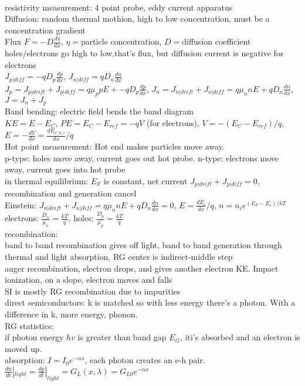 \documentclass{article}
\begin{document}
\\resistivity measurement: 4 point probe, eddy current apparatus
\\Diffusion: random thermal mothion, high to low concentration, must be a concentration gradient
\\Flux $F=-D\frac{d\eta}{dx}$, $\eta=$particle concentration, $D=$diffusion coefficient
\\holes/electrons go high to low,that's flux, but diffusion current is negative for electrons
\\$J_{p|diff}=-qD_p\frac{dp}{dx}$, $J_{n|diff}=qD_n\frac{dn}{dx}$
\\$J_p=J_{p|drift}+J_{p|diff}=q\mu_ppE+-qD_p\frac{dp}{dx}$, $J_n=J_{n|drift}+J_{n|diff}=q\mu_nnE+qD_n\frac{dn}{dx}$, $J=J_n+J_p$
\\Band bending: electric field bends the band diagram
\\$KE=E-E_C$, $PE=E_C-E_{ref}=-qV$ (for electrons), $V=-(E_C-E_{ref})/q$, $E=-\frac{dV}{dx}=\frac{dE_{C,V,i}}{dx}/q$
\\Hot point measurement: Hot end makes particles move away. 
\\p-type: holes move away, current goes out hot probe. n-type: electrons move away, current goes into hot probe
\\in thermal equilibrium: $E_F$ is constant, net current $J_{p|drift}+J_{p|diff}=0$, recombination and generation cancel
\\Einstein: $J_{n|drift}+J_{n|diff}=q\mu_nnE+qD_n\frac{dn}{dx}=0$, $E=\frac{dE_i}{dx}/q$, $n=n_ie^{(E_F-E_i)/kT}$
\\electrons: $\frac{D_n}{\mu_n}=\frac{kT}{q}$, holes: $\frac{D_p}{\mu_p}=\frac{kT}{q}$
\\recombination:
\\band to band recombination gives off light, band to band generation through thermal and light absorption, RG center is indirect-middle step
\\auger recombination, electron drops, and gives another electron KE. Impact ionization, on a slope, electron moves and falls
\\SI is mostly RG recombination due to impurities
\\direct semiconductors: k is matched so with less energy there's a photon. With a difference in k, more energy, phonon.
\\RG statistics:
\\if photon energy $hv$ is greater than band gap $E_G$, iti's absorbed and an electron is moved up.
\\absorption: $I=I_0e^{-\alpha x}$, each photon creates an e-h pair. $\frac{dn}{dt}|_{light}=\frac{dp}{dt}|_{light}=G_L(x,\lambda)=G_{L0}e^{-\alpha x}$
\end{document}
